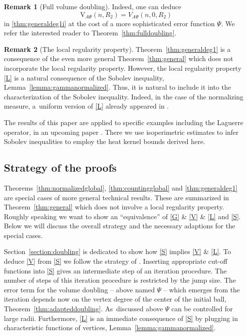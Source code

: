 \documentclass[JEP,XML,SOM,Unicode,published]{cedram}
\newcommand{\rV}{\mathrm{V}}
\theoremstyle{plain}
\theoremstyle{definition}
\newtheorem*{remark}{Remark}
\begin{document}
{\begin{remark}[Full volume doubling]
Indeed, one can deduce
\[
\rV_{\!A\Psi}(n,R_2)=V_{A\Psi}(n,0,R_2)
\]
in \eqref{thm:generaldeg1i} at the cost of a more sophisticated error function $\Psi$. We refer the interested reader to Theorem~\ref{thm:fulldoubling}.
\end{remark}}

\begin{remark}[The local regularity property] Theorem~\ref{thm:generaldeg1} is a consequence of the even more general Theorem~\ref{thm:general} which does not incorporate the local regularity property. However, the local regularity property \eqref{L} is a natural consequence of the Sobolev inequality, \cf Lemma~\ref{lemma:gammanormalized}. Thus, it is natural to include it into the characterization of the Sobolev inequality. Indeed, {in the case of the normalizing measure}, a~uniform version of \eqref{L} already appeared in \cite{BarlowChen-16}.
\end{remark}

The results of this paper are applied to specific examples including the Laguerre operator, \cf \cite{Kostenko-21} in an upcoming paper \cite{KellerKNR-24}. There we use isoperimetric estimates to infer Sobolev inequalities to employ the heat kernel bounds derived here.

\subsection{Strategy of the proofs}\label{sec:strategy}

Theorems~\ref{thm:normalizedglobal}, \ref{thm:countingglobal} and \ref{thm:generaldeg1} are special cases of more general technical results. These are summarized in Theorem~\ref{thm:general} which does not involve a local regularity property. Roughly speaking we want to show an ``equivalence'' of \eqref{G} \& \eqref{V} \& \eqref{L}
and \eqref{S}. Below we will discuss the overall strategy and the necessary adaptions for the special cases.

Section~\ref{section:doubling} is dedicated to show how \eqref{S} implies \eqref{V} \& \eqref{L}. To deduce \eqref{V} from \eqref{S} we follow the strategy of \cite{SaloffC-01}. Inserting appropriate cut-off functions into \eqref{S} gives an intermediate step of an iteration procedure. The number of steps of this iteration procedure is restricted by the jump size. The error term for the volume doubling -- above named $ {\Psi} $ -- which emerges from the iteration depends now on {the vertex degree of the center of} the initial ball, \cf Theorem~\ref{thm:adapteddoubling}. As~discussed above $\Psi $ can be controlled for large radii. Furthermore, \eqref{L} is an immediate consequence of \eqref{S} by plugging in characteristic functions of vertices, \cf Lemma~\ref{lemma:gammanormalized}.
\end{document}
